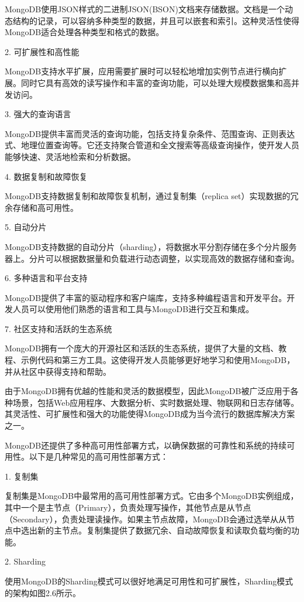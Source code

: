 MongoDB使用JSON样式的二进制JSON(BSON)文档来存储数据。文档是一个动态结构的记录，可以容纳多种类型的数据，并且可以嵌套和索引。这种灵活性使得MongoDB适合处理各种类型和格式的数据。

2. 可扩展性和高性能

MongoDB支持水平扩展，应用需要扩展时可以轻松地增加实例节点进行横向扩展。同时它具有高效的读写操作和丰富的查询功能，可以处理大规模数据集和高并发访问。

3. 强大的查询语言

MongoDB提供丰富而灵活的查询功能，包括支持复杂条件、范围查询、正则表达式、地理位置查询等。它还支持聚合管道和全文搜索等高级查询操作，使开发人员能够快速、灵活地检索和分析数据。

4. 数据复制和故障恢复

MongoDB支持数据复制和故障恢复机制，通过复制集（replica set）实现数据的冗余存储和高可用性。

5. 自动分片

MongoDB支持数据的自动分片（sharding），将数据水平分割存储在多个分片服务器上。分片可以根据数据量和负载进行动态调整，以实现高效的数据存储和查询。

6. 多种语言和平台支持

MongoDB提供了丰富的驱动程序和客户端库，支持多种编程语言和开发平台。开发人员可以使用他们熟悉的语言和工具与MongoDB进行交互和集成。

7. 社区支持和活跃的生态系统

MongoDB拥有一个庞大的开源社区和活跃的生态系统，提供了大量的文档、教程、示例代码和第三方工具。这使得开发人员能够更好地学习和使用MongoDB，并从社区中获得支持和帮助。

由于MongoDB拥有优越的性能和灵活的数据模型，因此MongoDB被广泛应用于各种场景，包括Web应用程序、大数据分析、实时数据处理、物联网和日志存储等。其灵活性、可扩展性和强大的功能使得MongoDB成为当今流行的数据库解决方案之一。

MongoDB还提供了多种高可用性部署方式，以确保数据的可靠性和系统的持续可用性。以下是几种常见的高可用性部署方式：

1. 复制集

复制集是MongoDB中最常用的高可用性部署方式。它由多个MongoDB实例组成，其中一个是主节点（Primary），负责处理写操作，其他节点是从节点（Secondary），负责处理读操作。如果主节点故障，MongoDB会通过选举从从节点中选出新的主节点。复制集提供了数据冗余、自动故障恢复和读取负载均衡的功能。

2. Sharding

使用MongoDB的Sharding模式可以很好地满足可用性和可扩展性，Sharding模式的架构如图2.6所示。

